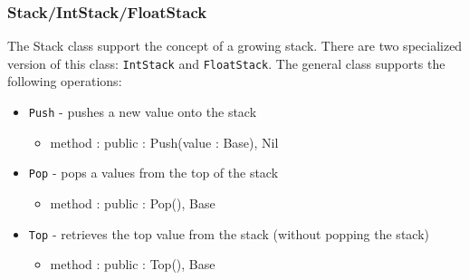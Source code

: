 \documentclass[12pt]{article}
\begin{document}
\subsubsection{Stack/IntStack/FloatStack}
The Stack class support the concept of a growing stack.  There are two specialized version of this class: \texttt{IntStack} and \texttt{FloatStack}.  The general class supports the following operations:
\begin{itemize}
    \item \texttt{Push} - pushes a new value onto the stack
    	\begin{itemize}
	\item method : public : Push(value : Base), Nil
	\end{itemize}
    \item \texttt{Pop} - pops a values from the top of the stack
    	\begin{itemize}
	\item method : public : Pop(), Base
	\end{itemize}
    \item \texttt{Top} - retrieves the top value from the stack (without popping the stack)
    	\begin{itemize}
	\item method : public : Top(), Base
	\end{itemize}
\end{itemize}
\end{document}
